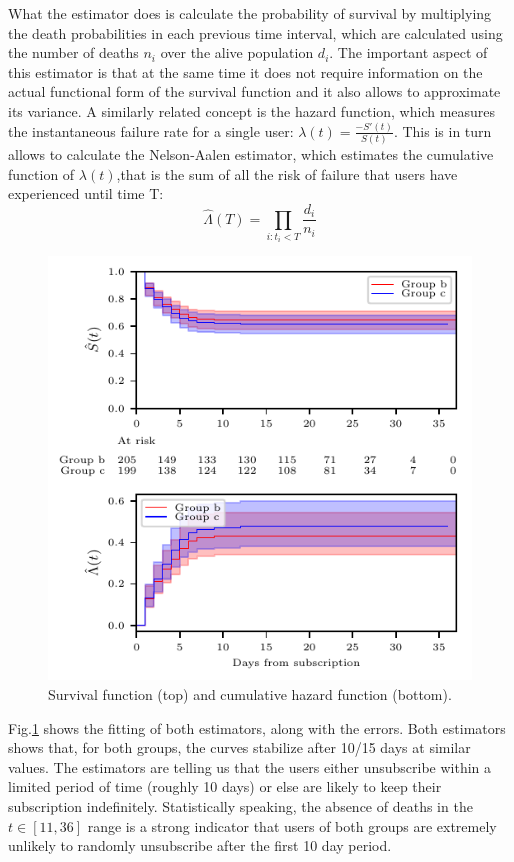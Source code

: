 \documentclass[paper=a4, fontsize=10pt]{report}
\begin{document}
What the estimator does is calculate the probability of survival by multiplying the death probabilities in each previous time interval, which
are calculated using the number of deaths $n_{i}$ over the alive population $d_{i}$. The important aspect of this 
estimator is that at the same time it does not require information on the actual functional form of the survival function
and it also allows to approximate its variance. A similarly related concept is the hazard function, which measures
the instantaneous failure rate for a single user: $ \lambda (t) = \frac{-S'(t)}{S(t)}
$. This is in turn allows to calculate the Nelson-Aalen estimator, which estimates the cumulative function of $\lambda(t)$,that
is the sum of all the risk of failure that users have experienced until time T:
\begin{equation}
 \hat{\Lambda}(T) = \prod_{i: t_{i} < T}  \frac{d_{i}}{n_{i}}
\end{equation}



\begin{figure}[h!]
\centering
\includegraphics[scale = 0.99]{survival.pdf}
\caption{Survival function (top) and cumulative hazard function (bottom).}
\label{fig:survival}
\end{figure}

Fig.\ref{fig:survival} shows the fitting of both estimators, along with the errors. Both estimators shows that, for both groups,
the curves stabilize after 10/15 days at similar values. The estimators are telling us that the users
either unsubscribe within a limited period of time (roughly 10 days) or else are likely to keep their subscription indefinitely. Statistically
speaking, the absence of deaths in the $t \in [11,36]$ range is a strong indicator that users of both groups are extremely unlikely to randomly
unsubscribe after the first 10 day period. 
\end{document}
